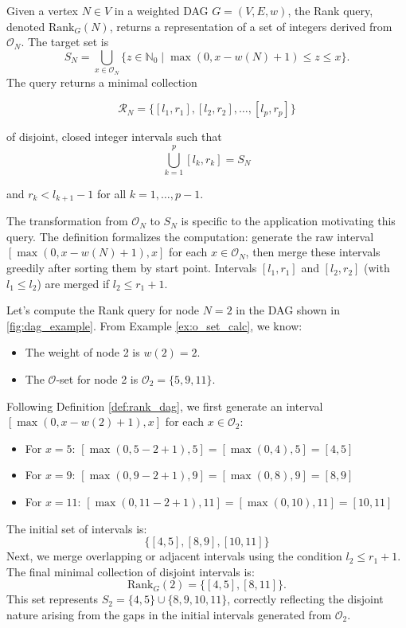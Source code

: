 \begin{definition}
    \label{def:rank_dag}
    Given a vertex $N \in V$ in a weighted DAG $G=(V, E, w)$, the Rank query, denoted $\mathrm{Rank}_G(N)$, returns a representation of a set of integers derived from $\mathcal{O}_N$. The target set is
    \[ S_N = \bigcup_{x \in \mathcal{O}_N} \{ z \in \mathbb{N}_0 \mid \max(0, x - w(N) + 1) \le z \le x \}. \]
    The query returns a minimal collection

    $$\mathcal{R}_N = \{[l_1, r_1], [l_2, r_2], \dots, [l_p, r_p]\}$$

    of disjoint, closed integer intervals such that
    $$\bigcup_{k=1}^{p} [l_k, r_k] = S_N$$

    and $r_k < l_{k+1}-1$ for all $k=1, \dots, p-1$.
\end{definition}

\begin{remark}
    The transformation from $\mathcal{O}_N$ to $S_N$ is specific to the application motivating this query. The definition formalizes the computation: generate the raw interval $[\max(0, x - w(N) + 1), x]$ for each $x \in \mathcal{O}_N$, then merge these intervals greedily after sorting them by start point. Intervals $[l_1, r_1]$ and $[l_2, r_2]$ (with $l_1 \le l_2$) are merged if $l_2 \le r_1 + 1$.
\end{remark}

\begin{example}
    \label{ex:rank_calc_disjoint}
    Let's compute the Rank query for node $N=2$ in the DAG shown in \autoref{fig:dag_example}. From Example \ref{ex:o_set_calc}, we know:
    \begin{itemize}
        \item The weight of node 2 is $w(2) = 2$.
        \item The $\mathcal{O}$-set for node 2 is $\mathcal{O}_2 = \{ 5, 9, 11 \}$.
    \end{itemize}
    Following Definition \ref{def:rank_dag}, we first generate an interval $[\max(0, x - w(2) + 1), x]$ for each $x \in \mathcal{O}_2$:
    \begin{itemize}
        \item For $x=5$: $[\max(0, 5 - 2 + 1), 5] = [\max(0, 4), 5] = [4, 5]$
        \item For $x=9$: $[\max(0, 9 - 2 + 1), 9] = [\max(0, 8), 9] = [8, 9]$
        \item For $x=11$: $[\max(0, 11 - 2 + 1), 11] = [\max(0, 10), 11] = [10, 11]$
    \end{itemize}
    The initial set of intervals is:
    $$ \{ [4, 5], [8, 9], [10, 11] \} $$
    Next, we merge overlapping or adjacent intervals using the condition $l_2 \le r_1 + 1$. The final minimal collection of disjoint intervals is:
    $$ \mathrm{Rank}_G(2) = \{ [4, 5], [8, 11] \}. $$
    This set represents $S_2 = \{4, 5\} \cup \{8, 9, 10, 11\}$, correctly reflecting the disjoint nature arising from the gaps in the initial intervals generated from $\mathcal{O}_2$.
\end{example}


